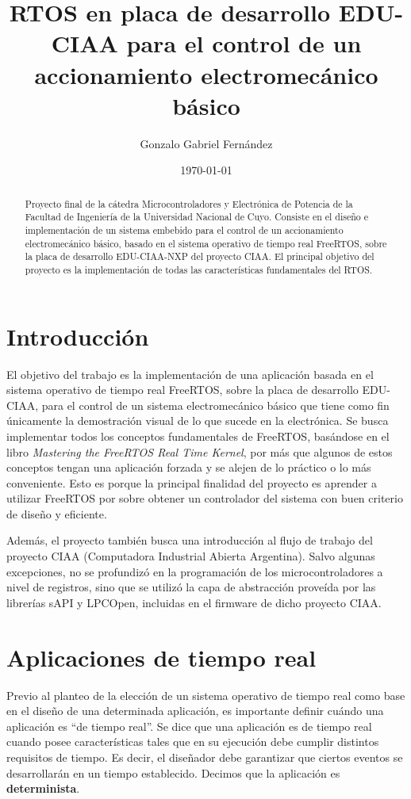 \documentclass{IEEEtran}
\title{RTOS en placa de desarrollo EDU-CIAA para el control de un accionamiento electromecánico básico}
\author{Gonzalo Gabriel Fernández}
\date{\today}
\begin{document}
\maketitle

\begin{abstract}
    Proyecto final de la cátedra Microcontroladores y Electrónica de Potencia de la Facultad de Ingeniería de la Universidad Nacional de Cuyo. Consiste en el diseño e implementación de un sistema embebido para el control de un accionamiento electromecánico básico, basado en el sistema operativo de tiempo real FreeRTOS, sobre la placa de desarrollo EDU-CIAA-NXP del proyecto CIAA. El principal objetivo del proyecto es la implementación de todas las características fundamentales del RTOS.
\end{abstract}

\section{Introducción}
El objetivo del trabajo es la implementación de una aplicación basada en el sistema operativo de tiempo real FreeRTOS, sobre la placa de desarrollo EDU-CIAA, para el control de un sistema electromecánico básico que tiene como fin únicamente la demostración visual de lo que sucede en la electrónica. Se busca implementar todos los conceptos fundamentales de FreeRTOS, basándose en el libro \textit{Mastering the FreeRTOS Real Time Kernel}\cite{FreeRTOS}, por más que algunos de estos conceptos tengan una aplicación forzada y se alejen de lo práctico o lo más conveniente. Esto es porque la principal finalidad del proyecto es aprender a utilizar FreeRTOS por sobre obtener un controlador del sistema con buen criterio de diseño y eficiente.

Además, el proyecto también busca una introducción al flujo de trabajo del proyecto CIAA (Computadora Industrial Abierta Argentina). Salvo algunas excepciones, no se profundizó en la programación de los microcontroladores a nivel de registros, sino que se utilizó la capa de abstracción proveída por las librerías sAPI y LPCOpen, incluidas en el firmware de dicho proyecto CIAA.

\section{Aplicaciones de tiempo real}
Previo al planteo de la elección de un sistema operativo de tiempo real como base en el diseño de una determinada aplicación, es importante definir cuándo una aplicación es ``de tiempo real''. Se dice que una aplicación es de tiempo real cuando posee características tales que en su ejecución debe cumplir distintos requisitos de tiempo. Es decir, el diseñador debe garantizar que ciertos eventos se desarrollarán en un tiempo establecido. Decimos que la aplicación es \textbf{determinista}.
\end{document}
